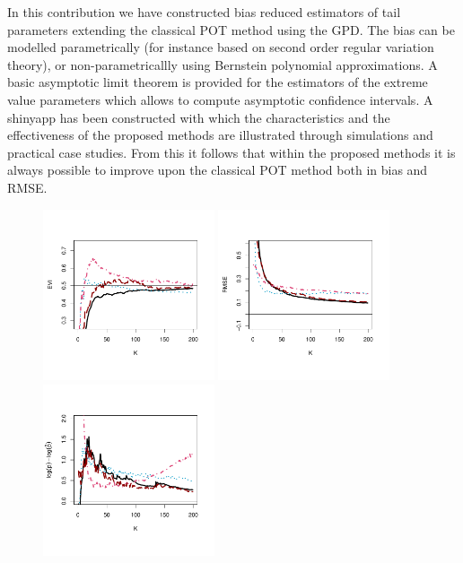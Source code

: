 In this contribution we have constructed bias reduced estimators of tail parameters extending the classical POT method using the GPD. The bias can be modelled parametrically (for instance based on second order regular variation theory), or non-parametricallly using Bernstein polynomial approximations. A basic asymptotic limit theorem is provided for the estimators of the extreme value parameters which allows to compute asymptotic confidence intervals. A shinyapp has been constructed with which the characteristics and the effectiveness of the proposed methods are illustrated through simulations and practical case studies. From this it follows that within the proposed methods it is always possible to improve upon the classical POT method both in bias and RMSE. 
\newpage
\begin{figure}[!ht]
 \centering
\includegraphics[width=0.45\textwidth]{./plots/paper3/burr05GPD_evi.pdf} 
\includegraphics[width=0.45\textwidth]{./plots/paper3/burr05GPD_rmse.pdf} \\
\includegraphics[width=0.45\textwidth]{./plots/paper3/burr05GPD_tail.pdf}

\end{figure}
